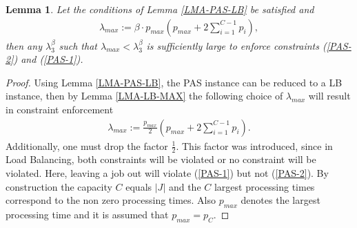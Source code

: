 \documentclass[12pt]{article}
\newtheorem{lemma}[theorem]{Lemma}
\begin{document}
\begin{lemma} \label{LMA-PAS-MS}
Let the conditions of Lemma \ref{LMA-PAS-LB} be satisfied and
\begin{gather*}
\lambda_{max} :=  \beta \cdot p_{max}\left(p_{max} + 2\sum_{i=1}^{C-1}p_i \right),
\end{gather*}
then any $\lambda_3^{\beta}$ such that $\lambda_{max} < \lambda_3^{\beta}$ is sufficiently large to enforce constraints (\ref{PAS-2}) and (\ref{PAS-1}).
\end{lemma}
\begin{proof}
Using Lemma \ref{LMA-PAS-LB}, the PAS instance can be reduced to a LB instance, then by Lemma \ref{LMA-LB-MAX} the following choice of $\lambda_{max}$ will result in constraint enforcement
\begin{gather*}
\lambda_{max} :=  \frac{p_{max}}{2}\left(p_{max} + 2\sum_{i=1}^{C-1}p_i \right).
\end{gather*}
Additionally, one must drop the factor $\frac{1}{2}$. 
This factor was introduced, since in Load Balancing, both constraints will be violated or no constraint will be violated.
Here, leaving a job out will violate (\ref{PAS-1}) but not (\ref{PAS-2}).
By construction the capacity $C$ equals $|J|$ and the $C$ largest processing times correspond to the non zero processing times.
Also $p_{max}$ denotes the largest processing time and it is assumed that $p_{max} = p_{C}$.
\end{proof}
\end{document}

